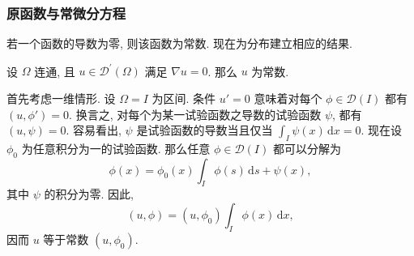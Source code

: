 \subsubsection{原函数与常微分方程}\label{subsec:distribution-primitives-odes}

若一个函数的导数为零, 则该函数为常数. 现在为分布建立相应的结果.

\begin{Theorem}
\label{thm:distribution-zero-gradient-constant}
设 $\Omega$ 连通, 且 $u\in\mathcal{D}^{\prime}(\Omega)$ 满足 $\nabla u=0$. 那么 $u$ 为常数.
\end{Theorem}

\begin{Proof}
首先考虑一维情形. 设 $\Omega=I$ 为区间. 条件 $u'=0$ 意味着对每个 $\phi\in\mathcal{D}(I)$ 都有 $(u,\phi')=0$. 换言之, 对每个为某一试验函数之导数的试验函数 $\psi$, 都有 $(u,\psi)=0$. 容易看出, $\psi$ 是试验函数的导数当且仅当 $\int_I\psi(x)\,\mathrm{d}x=0$. 现在设 $\phi_0$ 为任意积分为一的试验函数. 那么任意 $\phi\in\mathcal{D}(I)$ 都可以分解为
\begin{equation}\label{eq:test-function-one-dimensional-zero-integral-decomposition}
\phi(x)=\phi_0(x)\int_I\phi(s)\,\mathrm{d}s+\psi(x),
\end{equation}
其中 $\psi$ 的积分为零. 因此,
\begin{equation}\label{eq:zero-derivative-distribution-constant-pairing}
(u,\phi)=(u,\phi_0)\int_I\phi(x)\,\mathrm{d}x,
\end{equation}
因而 $u$ 等于常数 $(u,\phi_0)$.


\end{Proof}
